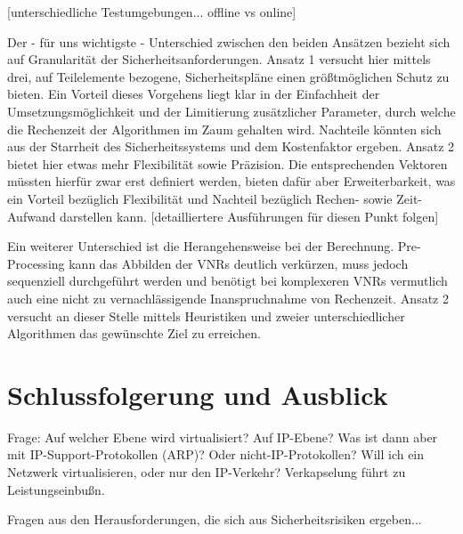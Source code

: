 \documentclass{lni}
\begin{document}
[unterschiedliche Testumgebungen... offline vs online]

Der - für uns wichtigste - Unterschied zwischen den beiden Ansätzen bezieht sich auf Granularität der Sicherheitsanforderungen. Ansatz 1 versucht hier mittels drei, auf Teilelemente bezogene, Sicherheitspläne einen größtmöglichen Schutz zu bieten. Ein Vorteil dieses Vorgehens liegt klar in der Einfachheit der Umsetzungsmöglichkeit und der Limitierung zusätzlicher Parameter, durch welche die Rechenzeit der Algorithmen im Zaum gehalten wird. Nachteile könnten sich aus der Starrheit des Sicherheitssystems und dem Kostenfaktor ergeben. Ansatz 2 bietet hier etwas mehr Flexibilität sowie Präzision. Die entsprechenden Vektoren müssten hierfür zwar erst definiert werden, bieten dafür aber Erweiterbarkeit, was ein Vorteil bezüglich Flexibilität und Nachteil bezüglich Rechen- sowie Zeit-Aufwand darstellen kann. [detailliertere Ausführungen für diesen Punkt folgen]

Ein weiterer Unterschied ist die Herangehensweise bei der Berechnung. Pre-Processing kann das Abbilden der VNRs deutlich verkürzen, muss jedoch sequenziell durchgeführt werden und benötigt bei komplexeren VNRs vermutlich auch eine nicht zu vernachlässigende Inanspruchnahme von Rechenzeit. Ansatz 2 versucht an dieser Stelle mittels Heuristiken und zweier unterschiedlicher Algorithmen das gewünschte Ziel zu erreichen.


\section{Schlussfolgerung und Ausblick}
\label{sec:schluss}
Frage: Auf welcher Ebene wird virtualisiert? Auf IP-Ebene? Was ist dann aber mit IP-Support-Protokollen (ARP)? Oder nicht-IP-Protokollen? Will ich ein Netzwerk virtualisieren, oder nur den IP-Verkehr? Verkapselung führt zu Leistungseinbußn. \cite{cabuk2007towards}

Fragen aus den Herausforderungen, die sich aus Sicherheitsrisiken ergeben...



{}
\end{document}
